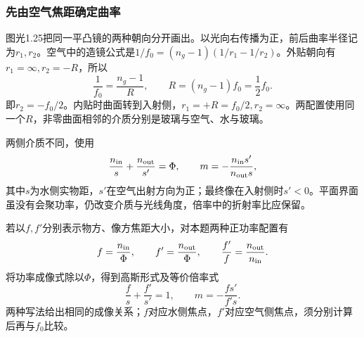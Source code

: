 \documentclass[UTF8,fontset=fandol,a4paper,11pt]{ctexart}
\begin{document}
\subsubsection*{先由空气焦距确定曲率}
图光1.25把同一平凸镜的两种朝向分开画出。以光向右传播为正，前后曲率半径记为$r_1,r_2$。空气中的造镜公式是$1/f_0=(n_g-1)(1/r_1-1/r_2)$。外贴朝向有$r_1=\infty,r_2=-R$，所以
\[
\frac1{f_0}=\frac{n_g-1}R,\qquad
\boxed{R=(n_g-1)f_0=\frac12f_0}.
\]
即$r_2=-f_0/2$。内贴时曲面转到入射侧，$r_1=+R=f_0/2,r_2=\infty$。两配置使用同一个$R$，非零曲面相邻的介质分别是玻璃与空气、水与玻璃。

两侧介质不同，使用
\[
\frac{n_{\rm in}}s+\frac{n_{\rm out}}{s'}=\Phi,
\qquad
m=-\frac{n_{\rm in}s'}{n_{\rm out}s},
\]
其中$s$为水侧实物距，$s'$在空气出射方向为正；最终像在入射侧时$s'<0$。平面界面虽没有会聚功率，仍改变介质与光线角度，倍率中的折射率比应保留。

若以$f,f'$分别表示物方、像方焦距大小，对本题两种正功率配置有
\[
f=\frac{n_{\rm in}}\Phi,\qquad
f'=\frac{n_{\rm out}}\Phi,\qquad
\frac{f'}f=\frac{n_{\rm out}}{n_{\rm in}}.
\]
将功率成像式除以$\Phi$，得到高斯形式及等价倍率式
\[
\frac f s+\frac{f'}{s'}=1,\qquad m=-\frac{fs'}{f's}.
\]
两种写法给出相同的成像关系；$f$对应水侧焦点，$f'$对应空气侧焦点，须分别计算后再与$f_0$比较。
\end{document}
